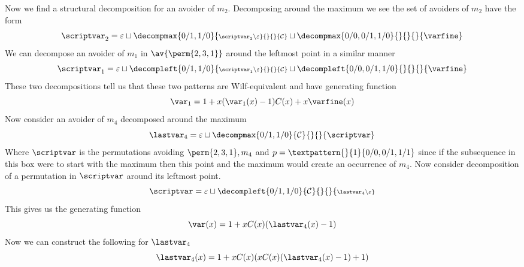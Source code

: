 Now we find a structural decomposition for an avoider of \(m_2\).
Decomposing around the maximum we see the set of avoiders of \(m_2\)
have the form
\begin{equation*}
    \scriptvar_2 = \varepsilon \sqcup
    \decompmax{0/1,1/0}{\scriptstyle\scriptvar_2\setminus\varepsilon}{}{}{\mathcal{C}}
    \sqcup
    \decompmax{0/0,0/1,1/0}{}{}{}{\mathcal{\varfine}}
\end{equation*}
We can decompose an avoider of \(m_1\) in \(\av{\perm{2,3,1}}\) around the leftmost point
in a similar manner
\begin{equation*}
    \scriptvar_1 = \varepsilon \sqcup
    \decompleft{0/1,1/0}{\scriptstyle\scriptvar_1\setminus\varepsilon}{}{}{\mathcal{C}}
    \sqcup
    \decompleft{0/0,0/1,1/0}{}{}{}{\mathcal{\varfine}}
\end{equation*}
These two decompositions tell us that these two patterns are Wilf-equivalent
and have generating function
\begin{equation}
    \var_1 = 1 + x(\var_1(x)-1)C(x) +x\varfine(x)
    \label{eqn:ngen}
\end{equation}
Now consider an avoider of \(m_4\) decomposed around the maximum\nextvar %
\begin{equation*}
    \mathcal{\lastvar}_4 = \varepsilon \sqcup
    \decompmax{0/1,1/0}{\mathcal{C}}{}{}{\scriptvar}
\end{equation*}
Where \(\scriptvar\) is the permutations avoiding \(\perm{2,3,1},m_4\) and
\(p = \textpattern{}{1}{0/0,0/1,1/1}\) since if the subsequence in this box
were to start with the maximum then this point and the maximum would create
an occurrence of \(m_4\).
Now consider decomposition of a permutation in \(\scriptvar\) around its
leftmost point.
\begin{equation*}
    \scriptvar = \varepsilon \sqcup
    \decompleft{0/1,1/0}{\mathcal{C}}{}{}{\scriptstyle\mathcal{\lastvar}_4\setminus\varepsilon}
\end{equation*}
This gives us the generating function
\begin{equation*}
    \var(x) = 1 + xC(x)(\lastvar_4(x)-1)
\end{equation*}
Now we can construct the following for \(\lastvar_4\)
\begin{equation}
    \lastvar_4(x) = 1 +xC(x)(xC(x)(\lastvar_4(x)-1)+1)
    \label{eqn:ngen2}
\end{equation}

